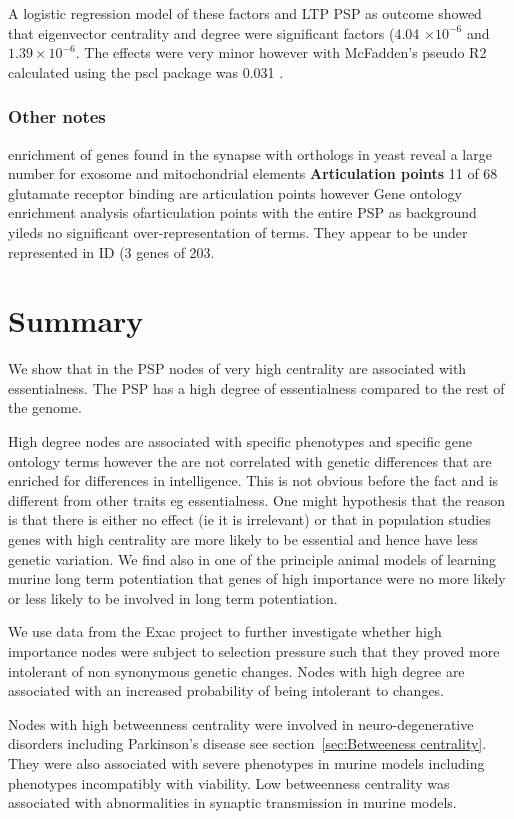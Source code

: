     A logistic regression model of these factors and LTP PSP as outcome showed that eigenvector centrality and degree were significant factors (4.04 $\times 10^{-6}$ and $1.39 \times 10^{-6}$. The effects were very minor however with McFadden's pseudo R2 \cite{mcfadden1973conditional} calculated using the pscl package was  0.031 \cite{jackman2017package}.

\subsubsection{Other notes}

enrichment of genes found in the synapse with orthologs in yeast reveal a large number for exosome and mitochondrial elements
\textbf{Articulation points}
11 of 68 glutamate receptor binding are articulation points however Gene ontology enrichment analysis ofarticulation points with the entire PSP as background yileds no significant over-representation of terms. They appear to be under represented in ID (3 genes of 203.	 	
\section{Summary}

We show that in the PSP nodes of very high centrality are associated with essentialness. The PSP has a high degree of essentialness compared to the rest of the genome. 

High degree nodes are associated with specific phenotypes and specific gene ontology terms however the are not correlated with genetic differences that are enriched for differences in intelligence. This is not obvious before the fact and is different from other traits eg essentialness. One might hypothesis that the reason is that there is either no effect (ie it is irrelevant) or that in population studies genes with high centrality are more likely to be essential and hence have less genetic variation. We find also in one of the principle animal models of learning murine long term potentiation that genes of high importance were no more likely or less likely to be involved in long term potentiation.

We use data from the Exac project to further investigate whether high importance nodes were subject to selection pressure such that they proved more intolerant of non synonymous genetic changes. Nodes with high degree are associated with an increased probability of being intolerant to changes. 

Nodes with high betweenness centrality were involved in neuro-degenerative disorders including Parkinson's disease see section~\ref{sec:Betweeness centrality}. They were also associated with severe phenotypes in murine models including phenotypes incompatibly with viability. Low betweenness centrality was associated with abnormalities in synaptic transmission in murine models. 


